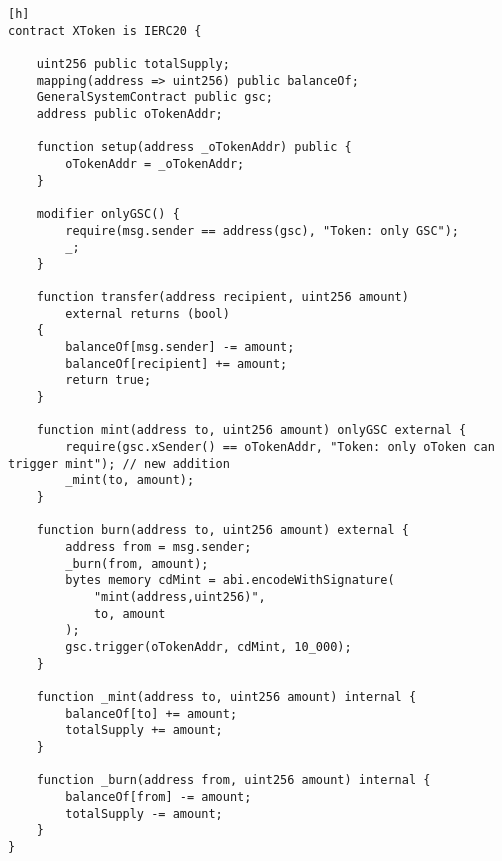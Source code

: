 \begin{lstlisting}[language=Solidity][h]
contract XToken is IERC20 {

    uint256 public totalSupply;
    mapping(address => uint256) public balanceOf;
    GeneralSystemContract public gsc;
    address public oTokenAddr;

    function setup(address _oTokenAddr) public {
        oTokenAddr = _oTokenAddr;
    }

    modifier onlyGSC() {
        require(msg.sender == address(gsc), "Token: only GSC");
        _;
    }

    function transfer(address recipient, uint256 amount)
        external returns (bool)
    {
        balanceOf[msg.sender] -= amount;
        balanceOf[recipient] += amount;
        return true;
    }

    function mint(address to, uint256 amount) onlyGSC external {
        require(gsc.xSender() == oTokenAddr, "Token: only oToken can trigger mint"); // new addition
        _mint(to, amount);
    }

    function burn(address to, uint256 amount) external {
        address from = msg.sender;
        _burn(from, amount);
        bytes memory cdMint = abi.encodeWithSignature(
            "mint(address,uint256)", 
            to, amount
        );
        gsc.trigger(oTokenAddr, cdMint, 10_000);
    }

    function _mint(address to, uint256 amount) internal {
        balanceOf[to] += amount;
        totalSupply += amount;
    }

    function _burn(address from, uint256 amount) internal {
        balanceOf[from] -= amount;
        totalSupply -= amount;
    }
}
\end{lstlisting}
